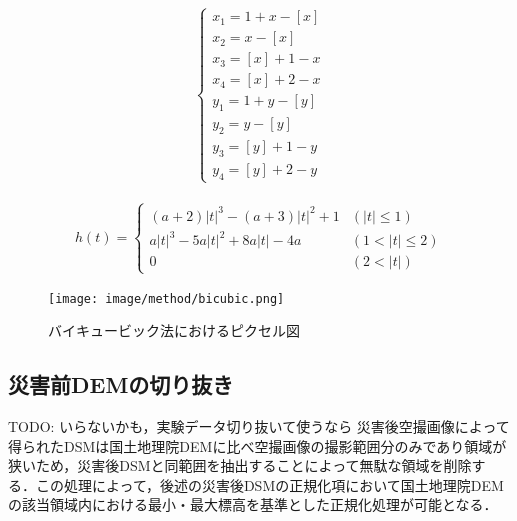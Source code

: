       \begin{eqnarray}
        \label{バイキュービック法2}
        \left\{
          \begin{array}{l}
            x_{1} = 1 + x - [x] \\
            x_{2} = x - [x]     \\
            x_{3} = [x] + 1 - x \\
            x_{4} = [x] + 2 - x \\
            y_{1} = 1 + y - [y] \\
            y_{2} = y - [y]     \\
            y_{3} = [y] + 1 - y \\
            y_{4} = [y] + 2 - y
          \end{array}
        \right.
      \end{eqnarray}

      \begin{eqnarray}
        \label{バイキュービック法3}
        h(t) = 
        \left\{
          \begin{array}{ll}
            (a + 2) |t|^3 - (a + 3)|t|^2 + 1 & (|t| \leq 1)   \\
            a|t|^3 - 5a|t|^2 + 8a|t| - 4a    & (1 < |t| \leq 2) \\
            0                                & (2 < |t|)
          \end{array}
        \right.
      \end{eqnarray}

      \begin{figure}[t]
        \centering
        \texttt{[image: image/method/bicubic.png]}
        \caption{バイキュービック法におけるピクセル図}
        \label{ピクセル図}
      \end{figure}

    \subsection{災害前DEMの切り抜き}
      TODO: いらないかも，実験データ切り抜いて使うなら
      災害後空撮画像によって得られたDSMは国土地理院DEMに比べ空撮画像の撮影範囲分のみであり領域が狭いため，災害後DSMと同範囲を抽出することによって無駄な領域を削除する．この処理によって，後述の{災害後DSMの正規化}項において国土地理院DEMの該当領域内における最小・最大標高を基準とした正規化処理が可能となる．

